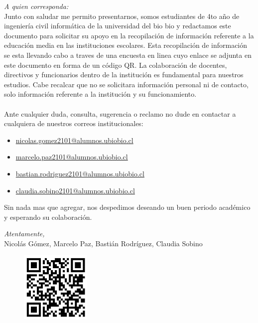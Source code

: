 \documentclass{templateNote}
\begin{document}


\portada
\margenes 

\noindent\textit{A quien corresponda:}\\

Junto con saludar me permito presentarnos, somos estudiantes de 4to año de ingeniería civil informática de la universidad del bio bio y redactamos este documento para solicitar su apoyo en la recopilación de información referente a la educación media en las instituciones escolares. Esta recopilación de información se esta llevando  cabo a traves de una encuesta en linea cuyo enlace se adjunta en este documento en forma de un código QR. La colaboración de docentes, directivos y funcionarios dentro de la institución es fundamental para nuestros estudios. Cabe recalcar que no se solicitara información personal ni de contacto, solo información referente a la institución y su funcionamiento.  
\\\\
Ante cualquier duda, consulta, sugerencia o reclamo no dude en contactar a cualquiera de nuestros correos institucionales:
\begin{itemize}
    \item \url{nicolas.gomez2101@alumnos.ubiobio.cl}
    \item \url{marcelo.paz2101@alumnos.ubiobio.cl}
    \item \url{bastian.rodriguez2101@alumnos.ubiobio.cl}
    \item \url{claudia.sobino2101@alumnos.ubiobio.cl}
\end{itemize}

\noindent Sin nada mas que agregar, nos despedimos deseando un buen periodo académico y esperando su colaboración.

\vspace*{0.8cm}
\begin{center}
    \textit{Atentamente,}\\
        Nicolás Gómez, Marcelo Paz, Bastián Rodríguez, Claudia Sobino
\end{center}

\vspace*{1cm}
\begin{figure}[H]
    \centering
    \includegraphics[width=0.3\textwidth]{img/qr.jpg}
\end{figure}
\end{document}
